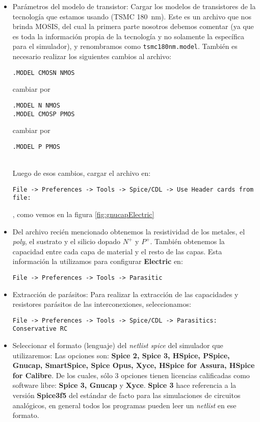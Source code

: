 \begin{itemize}
\item Parámetros del modelo de transistor: Cargar los modelos de transistores de la tecnología que estamos usando (TSMC 180~nm). Este es un archivo que nos brinda MOSIS, del cual la primera parte nosotros debemos comentar (ya que es toda la información propia de la tecnología y no solamente la específica para el simulador), y renombramos como {\footnotesize\verb#tsmc180nm.model#}. También es necesario realizar los siguientes cambios al archivo:\\
\begin{footnotesize}\verb#.MODEL CMOSN NMOS#\end{footnotesize} cambiar por \begin{footnotesize}\verb#.MODEL N NMOS# \\
\verb#.MODEL CMOSP PMOS#\end{footnotesize} cambiar por \begin{footnotesize}\verb#.MODEL P PMOS# \end{footnotesize} \\
Luego de esos cambios, cargar el archivo en:\\
\begin{footnotesize}\verb.File -> Preferences -> Tools -> Spice/CDL -> Use Header cards from file:.\end{footnotesize}, como vemos en la figura \ref{fig:gnucapElectric}
	\item Del archivo recién mencionado obtenemos la resistividad de los metales, el \emph{poly}, el sustrato y el silicio dopado $N^+$ y $P^+$. También obtenemos la capacidad entre cada capa de material y el resto de las capas. Esta información la utilizamos para configurar \textbf{Electric} en: \\
\begin{footnotesize}\verb.File -> Preferences -> Tools -> Parasitic. \end{footnotesize}
\item Extracción de parásitos: Para realizar la extracción de las capacidades y resistores parásitos de las interconexiones, seleccionamos: \\
\begin{footnotesize}\verb.File -> Preferences -> Tools -> Spice/CDL -> Parasitics: Conservative RC. \end{footnotesize}
\item Seleccionar el formato (lenguaje) del \emph{netlist spice} del simulador que utilizaremos: Las opciones son: \textbf{Spice 2, Spice 3, HSpice, PSpice, Gnucap, SmartSpice,  Spice Opus, Xyce, HSpice for Assura, HSpice for Calibre}. De los cuales, sólo 3 opciones tienen licencias calificadas como software libre: \textbf{Spice 3, Gnucap} y \textbf{Xyce}. \textbf{Spice 3} hace referencia a la versión \textbf{Spice3f5} del estándar de facto para las simulaciones de circuitos analógicos, en general todos los programas pueden leer un \emph{netlist} en ese formato.
\end{itemize}


